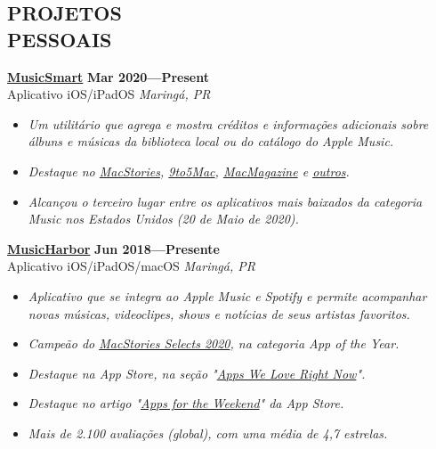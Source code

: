 \documentclass[line,margin]{res}
\begin{document}
\begin{resume}
\section{PROJETOS \\ PESSOAIS}
  {\bf \href{https://apps.apple.com/us/app/musicsmart/id1512195368}{MusicSmart}} \hfill {\bf Mar 2020---Present} \\
  Aplicativo iOS/iPadOS \hfill {\sl Maring\'a, PR}\\[-6pt]
    \begin{itemize}
    \item {\sl Um utilitário que agrega e mostra créditos e informações adicionais sobre álbuns e músicas da biblioteca local ou do catálogo do Apple Music.}
    \item {\sl Destaque no \href{https://www.macstories.net/reviews/musicsmart-puts-the-spotlight-on-music-credits/}{MacStories}, \href{https://9to5mac.com/2020/05/19/musicsmart-apple-music-app/}{9to5Mac}, \href{https://macmagazine.uol.com.br/post/2020/05/21/aplicativo-brasileiro-musicsmart-traz-detalhes-aprofundados-sobre-as-cancoes-do-apple-music/}{MacMagazine} e \href{https://twitter.com/chockenberry/status/1262803700658999296}{outros}.}
    \item {\sl Alcançou o terceiro lugar entre os aplicativos mais baixados da categoria Music nos Estados Unidos (20 de Maio de 2020).}
    \end{itemize}

  {\bf \href{https://apps.apple.com/us/app/musicharbor/id1440405750}{MusicHarbor}} \hfill {\bf Jun 2018---Presente} \\
  Aplicativo iOS/iPadOS/macOS \hfill {\sl Maring\'a, PR}\\[-6pt]
    \begin{itemize}
    \item {\sl Aplicativo que se integra ao Apple Music e Spotify e permite acompanhar novas músicas, videoclipes, shows e notícias de seus artistas favoritos.}
    \item {\sl Campeão do \href{https://apps.apple.com/us/story/id1516537723}{MacStories Selects 2020}, na categoria App of the Year.}
    \item {\sl Destaque na App Store, na seção "\href{https://github.com/marcosatanaka/resume-latex/blob/master/images/apps_we_love_right_now.png?raw=true}{Apps We Love Right Now}".}
    \item {\sl Destaque no artigo "\href{https://apps.apple.com/us/story/id1516537723}{Apps for the Weekend}" da App Store.}
    \item {\sl Mais de 2.100 avaliações (global), com uma média de 4,7 estrelas.}
    \end{itemize}


\end{resume}
\end{document}
